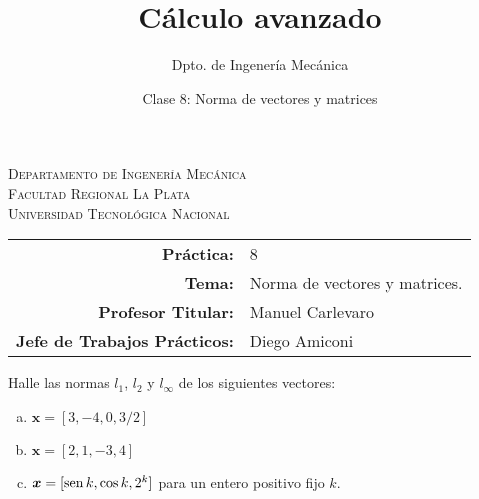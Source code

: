 \documentclass[11pt]{article}
\title{Cálculo avanzado}
\author{Dpto. de Ingenería Mecánica}
\date{Clase 8: Norma de vectores y matrices}
\begin{document}

\begin{center}
\end{center} 

\begin{center}
\vspace{\baselineskip}
\Large{\textsc{Departamento de Ingenería Mecánica}} \\
\textsc{Facultad Regional La Plata} \\
\textsc{Universidad Tecnológica Nacional}
\end{center}


\begin{center}
\begin{tabular}{r l}
    \textbf{Práctica:} & 8 \\
 \textbf{Tema:} & Norma de vectores y matrices. \\
 \textbf{Profesor Titular:} & Manuel Carlevaro \\
 \textbf{Jefe de Trabajos Prácticos:} & Diego Amiconi \\
\end{tabular}\end{center}

\vspace{1em}

\begin{question} %
    Halle las normas $l_1$, $l_2$ y $l_{\infty}$ de los siguientes vectores:
    \begin{enumerate}[a)]
    \item $\bm{x} = [3, -4, 0, 3/2]$
    \item $\bm{x} = [2, 1, -3, 4]$
    \item $\bm{x} = [\operatorname{sen} k, \cos k, 2^k]$ para un entero positivo fijo $k$.
    \end{enumerate}
\end{question}
\end{document}
